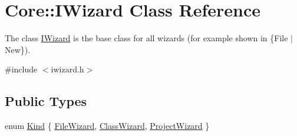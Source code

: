 \hypertarget{class_core_1_1_i_wizard}{\section{\-Core\-:\-:\-I\-Wizard \-Class \-Reference}
\label{class_core_1_1_i_wizard}
}


\-The class \hyperlink{class_core_1_1_i_wizard}{\-I\-Wizard} is the base class for all wizards (for example shown in  \{\-File $|$ \-New\}).  




{\ttfamily \#include $<$iwizard.\-h$>$}

\subsection*{\-Public \-Types}
\begin{DoxyCompactItemize}
\item 
enum \hyperlink{group___core_plugin_ga90d21d8ad72cb14ddb8486fdff7b51f4}{\-Kind} \{ \hyperlink{group___core_plugin_gga90d21d8ad72cb14ddb8486fdff7b51f4aa24018418bb2ddf6c02d2b792c5fabe8}{\-File\-Wizard}, 
\hyperlink{group___core_plugin_gga90d21d8ad72cb14ddb8486fdff7b51f4ab0cb08b20b12fbf556268c165353035a}{\-Class\-Wizard}, 
\hyperlink{group___core_plugin_gga90d21d8ad72cb14ddb8486fdff7b51f4a458498ed994138c90140befda7a20b58}{\-Project\-Wizard}
 \}
\end{DoxyCompactItemize}
